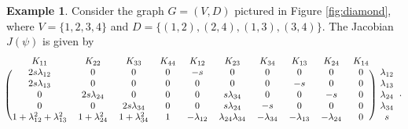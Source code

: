 \documentclass[12pt,reqno]{amsart}
\theoremstyle{plain}
\theoremstyle{definition}
\newtheorem{example}[theorem]{Example}
\begin{document}
\begin{example}\label{ex_jac}
Consider the graph $G=(V,D)$ pictured in Figure \ref{fig:diamond}, where $V=\{1,2,3,4\}$ and $D=\{(1,2),(2,4),(1,3),(3,4)\}$. The Jacobian $J(\psi)$ is given by
$$\begin{blockarray}{ccccccccccc}
K_{11} & K_{22} & K_{33} & K_{44} & K_{12} & K_{23} & K_{34} & K_{13} & K_{24} & K_{14} \\
\begin{block}{(cccccccccc)c}
  2s\lambda_{12} & 0 & 0 & 0    & -s & 0 & 0 & 0 & 0 & 0 & \lambda_{12}\\
  2s\lambda_{13} & 0 & 0 & 0    & 0 & 0 & 0 & -s & 0 & 0 & \lambda_{13}\\
  0 & 2s\lambda_{24} & 0 & 0    & 0 & s\lambda_{34} & 0 & 0 & -s & 0 & \lambda_{24}\\
  0 & 0 & 2s\lambda_{34} & 0    & 0 & s\lambda_{24} & -s & 0 & 0 & 0 & \lambda_{34}\\
  1+\lambda_{12}^2+\lambda_{13}^2 & 1+\lambda_{24}^2 & 1+\lambda_{34}^2 & 1 & -\lambda_{12} & \lambda_{24}\lambda_{34} & -\lambda_{34} & -\lambda_{13} & -\lambda_{24} & 0 & s\\
\end{block}
\end{blockarray}.
$$
\end{example}
\end{document}
